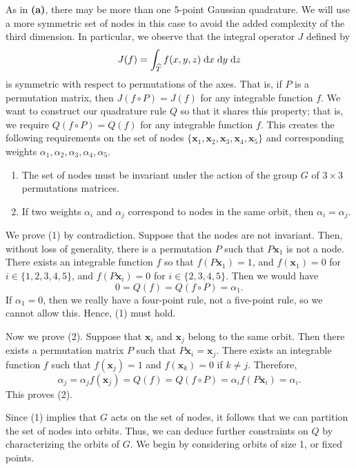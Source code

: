 \documentclass{homework}
\begin{document}
\begin{alphaparts}
		\newcommand{\xb}{\mathbf{x}}
		\questionpart As in \textbf{(a)}, there may be more than one 5-point Gaussian quadrature. We will use a more symmetric set of nodes in this case to avoid the added complexity of the third dimension. In particular, we observe that the integral operator $J$ defined by
		\begin{equation*}
			J(f) = \int_{\widehat{T}}f(x,y,z)\;\text{d} x\;\text{d} y\;\text{d} z
		\end{equation*}
		is symmetric with respect to permutations of the axes. That is, if $P$ is a permutation matrix, then $J(f\circ P) = J(f)$ for any integrable function $f$. We want to construct our quadrature rule $Q$ so that it shares this property; that is, we require $Q(f\circ P) = Q(f)$ for any integrable function $f$. This creates the following requirements on the set of nodes $\{\xb_1, \xb_2, \xb_3, \xb_4, \xb_5\}$ and corresponding weights $\alpha_1,\alpha_2,\alpha_3,\alpha_4,\alpha_5$.
		\begin{enumerate}[label=(\arabic*)]
			\item The set of nodes must be invariant under the action of the group $G$ of $3\times 3$ permutations matrices.
			\item If two weights $\alpha_i$ and $\alpha_j$ correspond to nodes in the same orbit, then $\alpha_i =\alpha_j$.
		\end{enumerate}
		We prove (1) by contradiction. Suppose that the nodes are not invariant. Then, without loss of generality, there is a permutation $P$ such that $P\xb_1$ is not a node. There exists an integrable function $f$ so that $f(P\xb_1) = 1$, and $f(\xb_1) = 0$ for $i\in\{1,2,3,4,5\}$, and $f(P\xb_i) = 0$ for $i \in \{2,3,4,5\}$. Then we would have
		\begin{equation*}
			0 = Q(f) = Q(f\circ P) = \alpha_1.
		\end{equation*}
		If $\alpha_1 = 0$, then we really have a four-point rule, not a five-point rule, so we cannot allow this. Hence, (1) must hold.
		
		Now we prove (2). Suppose that $\xb_i$ and $\xb_j$ belong to the same orbit. Then there exists a permutation matrix $P$ such that $P\xb_i = \xb_j$. There exists an integrable function $f$ such that $f(\xb_j) = 1$ and $f(\xb_k) = 0$ if $k \ne j$. Therefore,
		\begin{equation*}
			\alpha_j = \alpha_jf(\xb_j) = Q(f) = Q(f\circ P) = \alpha_i f(P\xb_i) = \alpha_i.
		\end{equation*}
		This proves (2).
		
		Since (1) implies that $G$ acts on the set of nodes, it follows that we can partition the set of nodes into orbits. Thus, we can deduce further constraints on $Q$ by characterizing the orbits of $G$. We begin by considering orbits of size 1, or fixed points. 
		

\end{alphaparts}
\end{document}
